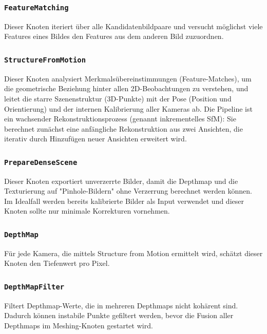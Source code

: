 \documentclass[german,notitlepage,smartquotes]{hgbreport}
\begin{document}
\subsubsection{\texttt{FeatureMatching}}

Dieser Knoten iteriert über alle Kandidatenbildpaare und versucht möglichst viele Features eines Bildes den Features aus dem anderen Bild zuzuordnen.

\subsubsection{\texttt{StructureFromMotion}}

Dieser Knoten analysiert Merkmalsübereinstimmungen (Feature-Matches), um die geometrische Beziehung hinter allen 2D-Beobachtungen zu verstehen, und leitet die starre Szenenstruktur (3D-Punkte) mit der Pose (Position und Orientierung) und der internen Kalibrierung aller Kameras ab. Die Pipeline ist ein wachsender Rekonstruktionsprozess (genannt inkrementelles SfM): Sie berechnet zunächst eine anfängliche Rekonstruktion aus zwei Ansichten, die iterativ durch Hinzufügen neuer Ansichten erweitert wird.

\subsubsection{\texttt{PrepareDenseScene}}

Dieser Knoten exportiert unverzerrte Bilder, damit die Depthmap und die Texturierung auf "Pinhole-Bildern" ohne Verzerrung berechnet werden können.
Im Idealfall werden bereits kalibrierte Bilder als Input verwendet und dieser Knoten sollte nur minimale Korrekturen vornehmen.

\subsubsection{\texttt{DepthMap}}

Für jede Kamera, die mittels Structure from Motion ermittelt wird, schätzt dieser Knoten den Tiefenwert pro Pixel.

\subsubsection{\texttt{DepthMapFilter}}

Filtert Depthmap-Werte, die in mehreren Depthmaps nicht kohärent sind.
Dadurch können instabile Punkte gefiltert werden, bevor die Fusion aller Depthmaps im Meshing-Knoten gestartet wird.
\end{document}
